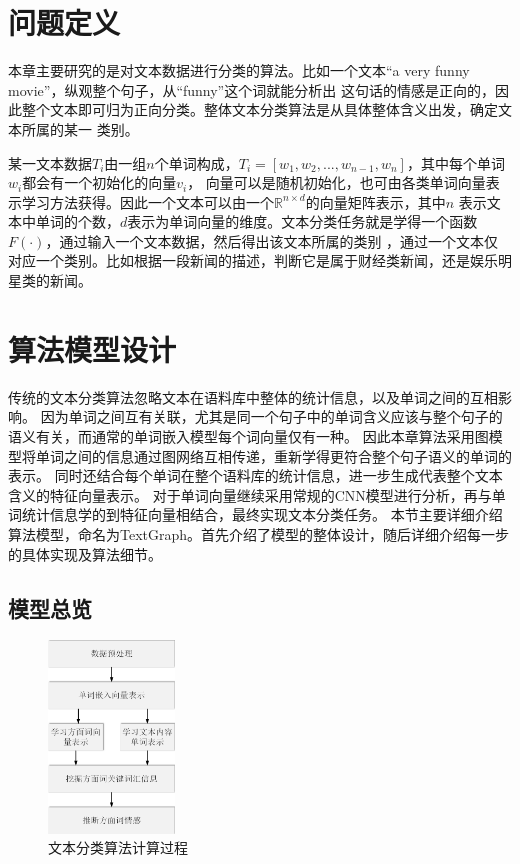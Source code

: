 \section{问题定义}
本章主要研究的是对文本数据进行分类的算法。比如一个文本“a very funny movie”，纵观整个句子，从“funny”这个词就能分析出
这句话的情感是正向的，因此整个文本即可归为正向分类。整体文本分类算法是从具体整体含义出发，确定文本所属的某一
类别。

某一文本数据$T_i$由一组$n$个单词构成，$T_i=[w_1,w_2,...,w_{n-1},w_n]$，其中每个单词$w_i$都会有一个初始化的向量$v_i$，
向量可以是随机初始化，也可由各类单词向量表示学习方法获得。因此一个文本可以由一个$\mathbb{R}^{n\times d}$的向量矩阵表示，其中$n$
表示文本中单词的个数，$d$表示为单词向量的维度。文本分类任务就是学得一个函数$F(\cdot)$，通过输入一个文本数据，然后得出该文本所属的类别
，通过一个文本仅对应一个类别。比如根据一段新闻的描述，判断它是属于财经类新闻，还是娱乐明星类的新闻。


\section{算法模型设计}
传统的文本分类算法忽略文本在语料库中整体的统计信息，以及单词之间的互相影响。
因为单词之间互有关联，尤其是同一个句子中的单词含义应该与整个句子的语义有关，而通常的单词嵌入模型每个词向量仅有一种。
因此本章算法采用图模型将单词之间的信息通过图网络互相传递，重新学得更符合整个句子语义的单词的表示。
同时还结合每个单词在整个语料库的统计信息，进一步生成代表整个文本含义的特征向量表示。
对于单词向量继续采用常规的CNN模型进行分析，再与单词统计信息学的到特征向量相结合，最终实现文本分类任务。
本节主要详细介绍算法模型，命名为TextGraph。首先介绍了模型的整体设计，随后详细介绍每一步的具体实现及算法细节。
\subsection{模型总览}
\begin{figure}[htb]%
	\setlength{\belowcaptionskip}{0pt}
	\centering
	\includegraphics[width=0.3\textwidth]{pic/textgraphLct.png}
	\caption{文本分类算法计算过程}
	\label{textgraphLct}
\end{figure}

